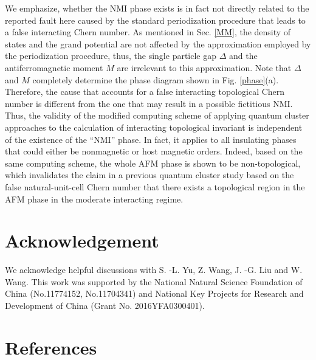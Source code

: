 \documentclass[12pt]{iopart}
\begin{document}
\par We emphasize, whether the NMI phase exists is in fact not directly related to the reported fault here caused by the standard periodization procedure that leads to a false interacting Chern number. As mentioned in Sec. \ref{MM}, the density of states and the grand potential are not affected by the approximation employed by the periodization procedure, thus, the single particle gap $\Delta$ and the antiferromagnetic moment $M$ are irrelevant to this approximation. Note that $\Delta$ and $M$ completely determine the phase diagram shown in Fig. \ref{phase}(a). Therefore, the cause that accounts for a false interacting topological Chern number is different from the one that may result in a possible fictitious NMI. Thus, the validity of the modified computing scheme of applying quantum cluster approaches to the calculation of interacting topological invariant is independent of the existence of the ``NMI'' phase. In fact, it applies to all insulating phases that could either be nonmagnetic or host magnetic orders. Indeed, based on the same computing scheme, the whole AFM phase is shown to be non-topological, which invalidates the claim in a previous quantum cluster study based on the false natural-unit-cell Chern number that there exists a topological region in the AFM phase in the moderate interacting regime.

\section*{Acknowledgement}
\par We acknowledge helpful discussions with S. -L. Yu, Z. Wang, J. -G. Liu and W. Wang. This work was supported by the National Natural Science Foundation of China (No.11774152, No.11704341) and National Key Projects for Research and Development of China (Grant No. 2016YFA0300401).

\section*{References}

\end{document}
